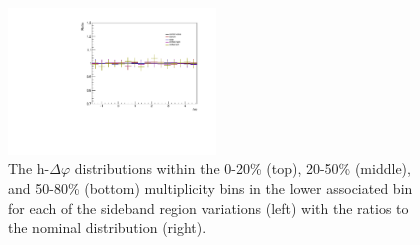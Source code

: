 \begin{figure}[ht]
    \includegraphics[width=0.49\textwidth]{figures/analysis/sideband_variations_dphi_50_80_lowpt_ratio.pdf}
    \caption{The h-\lmb $\Delta\varphi$ distributions within the 0-20\% (top), 20-50\% (middle), and 50-80\% (bottom) multiplicity bins in the lower associated \pt bin for each of the sideband region variations (left) with the ratios to the nominal distribution (right).}
    \label{fig:sideband_region_variations_lowpt}
\end{figure}

